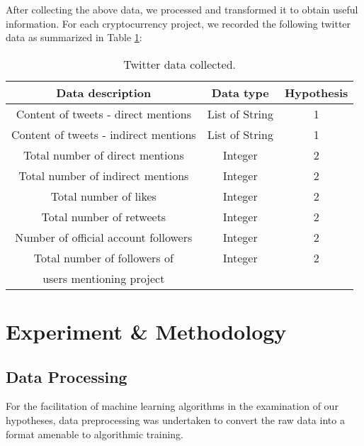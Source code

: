 \documentclass[runningheads]{llncs}
\begin{document}
After collecting the above data, we processed and transformed it to obtain useful information. For each cryptocurrency project, we recorded the following twitter data as summarized in Table \ref{tab4}:

\begin{table}[htbp]
\caption{Twitter data collected.}
\begin{center}
\begin{tabular}{|c|c|c|}
\hline
\textbf{Data description} & \textbf{Data type} & \textbf{Hypothesis} \\
\hline
Content of tweets - direct mentions & List of String & 1 \\
\hline
Content of tweets - indirect mentions & List of String & 1 \\
\hline
Total number of direct mentions & Integer & 2 \\
\hline
Total number of indirect mentions & Integer & 2 \\
\hline
Total number of likes & Integer & 2 \\
\hline
Total number of retweets & Integer & 2 \\
\hline
Number of official account followers & Integer & 2 \\
\hline
Total number of followers of  & Integer & 2 \\
users mentioning project && \\
\hline
\end{tabular}
\label{tab4}
\end{center}
\end{table}

\section{Experiment \& Methodology}

\subsection{Data Processing}

For the facilitation of machine learning algorithms in the examination of our hypotheses, data preprocessing was undertaken to convert the raw data into a format amenable to algorithmic training.

\end{document}
